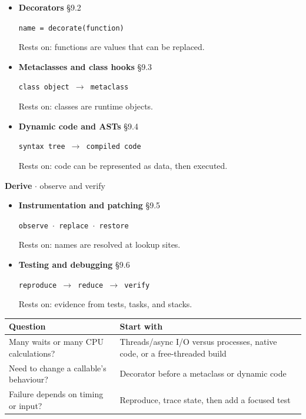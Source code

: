 \documentclass[11pt]{article}
\begin{document}
\begin{keepsection}
\begin{itemize}
\texttt{type \ensuremath{\cdot} attributes \ensuremath{\cdot} signature}

Rests on: runtime objects expose metadata.
\item {}
\textbf{Decorators} \hfill{\small\color{FAUblue}§9.2}

\texttt{name = decorate(function)}

Rests on: functions are values that can be replaced.
\item {}
\textbf{Metaclasses and class hooks} \hfill{\small\color{FAUblue}§9.3}

\texttt{class object \ensuremath{\to} metaclass}

Rests on: classes are runtime objects.
\item {}
\textbf{Dynamic code and ASTs} \hfill{\small\color{FAUblue}§9.4}

\texttt{syntax tree \ensuremath{\to} compiled code}

Rests on: code can be represented as data, then executed.
\end{itemize}

\textbf{Derive} \ensuremath{\cdot} observe and verify

\begin{itemize}
\item {}
\textbf{Instrumentation and patching} \hfill{\small\color{FAUblue}§9.5}

\texttt{observe \ensuremath{\cdot} replace \ensuremath{\cdot} restore}

Rests on: names are resolved at lookup sites.
\item {}
\textbf{Testing and debugging} \hfill{\small\color{FAUblue}§9.6}

\texttt{reproduce \ensuremath{\to} reduce \ensuremath{\to} verify}

Rests on: evidence from tests, tasks, and stacks.
\end{itemize}

\begin{center}\small\begin{tabularx}{\linewidth}{>{\raggedright\arraybackslash}X>{\raggedright\arraybackslash}X}\toprule
\textbf{Question} & \textbf{Start with} \\ \midrule
Many waits or many CPU calculations? & Threads/async I/O versus processes, native code, or a free-threaded build \\
Need to change a callable’s behaviour? & Decorator before a metaclass or dynamic code \\
Failure depends on timing or input? & Reproduce, trace state, then add a focused test \\
\bottomrule\end{tabularx}\end{center}
\end{keepsection}
\end{document}
